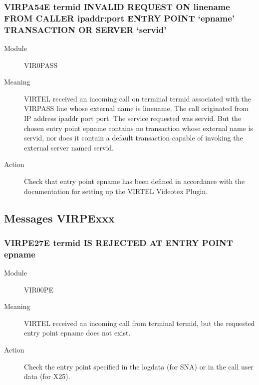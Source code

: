 \documentclass[letterpaper,10pt,english]{sphinxmanual}
\begin{document}
\subsubsection{VIRPA54E termid INVALID REQUEST ON linename FROM CALLER ipaddr:port ENTRY POINT ‘epname’ TRANSACTION OR SERVER ‘servid’}
\label{\detokenize{messages:virpa54e-termid-invalid-request-on-linename-from-caller-ipaddr-port-entry-point-epname-transaction-or-server-servid}}\begin{description}
\item[{Module}] \leavevmode
VIR0PASS

\item[{Meaning}] \leavevmode
VIRTEL received an incoming call on terminal termid associated with the VIRPASS line whose external name is linename. The call originated from IP address ipaddr port port. The service requested was servid. But the chosen entry point epname contains no transaction whose external name is servid, nor does it contain a default transaction capable of invoking the external server named servid.

\item[{Action}] \leavevmode
Check that entry point epname has been defined in accordance with the documentation for setting up the VIRTEL Videotex Plugin.

\end{description}


\subsection{Messages VIRPExxx}
\label{\detokenize{messages:messages-virpexxx}}

\subsubsection{VIRPE27E termid IS REJECTED AT ENTRY POINT epname}
\label{\detokenize{messages:virpe27e-termid-is-rejected-at-entry-point-epname}}\begin{description}
\item[{Module}] \leavevmode
VIR00PE

\item[{Meaning}] \leavevmode
VIRTEL received an incoming call from terminal termid, but the requested entry point epname does not exist.

\item[{Action}] \leavevmode
Check the entry point specified in the logdata (for SNA) or in the call user data (for X25).

\end{description}
\end{document}
